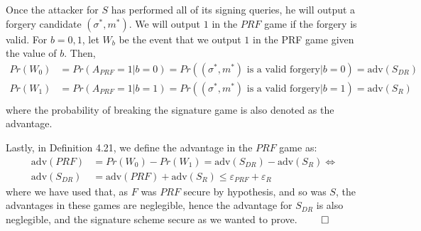 Once the attacker for $S$ has performed all of its signing queries, he will output a forgery candidate $(\sigma^*, m^*)$.
We will output $1$ in the $PRF$ game if the forgery is valid.
For $b = 0,1$, let $W_b$ be the event that we output $1$ in the PRF game given the value of $b$. Then,
\begin{equation*}
    \begin{split}
        Pr(W_0) &= Pr(A_{PRF} = 1 | b = 0) = Pr((\sigma^*, m^*) \text{ is a valid forgery} | b = 0) = \text{adv}(S_{DR}) \\
        Pr(W_1) &= Pr(A_{PRF} = 1 | b = 1) = Pr((\sigma^*, m^*) \text{ is a valid forgery} | b = 1) = \text{adv}(S_{R}) \\
    \end{split}
\end{equation*}
where the probability of breaking the signature game is also denoted as the advantage.

Lastly, in Definition 4.21, we define the advantage in the $PRF$ game as:
\begin{equation*}
    \begin{split}
        \text{adv}(PRF) &= Pr(W_0) - Pr(W_1) = \text{adv}(S_{DR}) - \text{adv}(S_R) \Leftrightarrow \\
        \text{adv}(S_{DR}) &= \text{adv}(PRF) + \text{adv}(S_R) \leq \varepsilon_{PRF} + \varepsilon_{R}
    \end{split}
\end{equation*}
where we have used that, as $F$ was $PRF$ secure by hypothesis, and so was $S$, the advantages in these games are neglegible, hence the advantage for $S_{DR}$ is also neglegible, and the signature scheme secure as we wanted to prove. \hfill $\qed$
